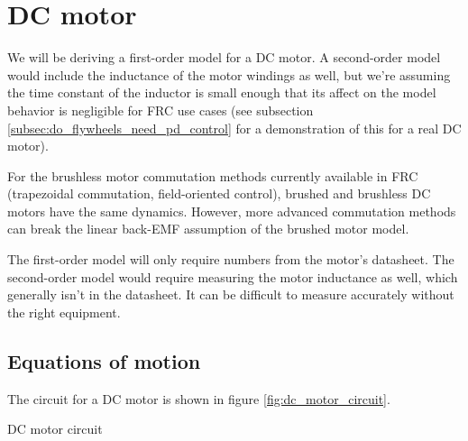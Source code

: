 \section{DC motor}
\label{sec:dc_motor}

We will be deriving a first-order \gls{model} for a DC motor. A second-order
\gls{model} would include the inductance of the motor windings as well, but
we're assuming the time constant of the inductor is small enough that its affect
on the \gls{model} behavior is negligible for FRC use cases (see subsection
\ref{subsec:do_flywheels_need_pd_control} for a demonstration of this for a real
DC motor).
\begin{remark}
  For the brushless motor commutation methods currently available in FRC
  (trapezoidal commutation, field-oriented control), brushed and brushless DC
  motors have the same dynamics. However, more advanced commutation methods can
  break the linear back-EMF assumption of the brushed motor model.
\end{remark}

The first-order \gls{model} will only require numbers from the motor's
datasheet. The second-order \gls{model} would require measuring the motor
inductance as well, which generally isn't in the datasheet. It can be difficult
to measure accurately without the right equipment.

\subsection{Equations of motion}

The circuit for a DC motor is shown in figure
\ref{fig:dc_motor_circuit}.
\begin{bookfigure}

  \caption{DC motor circuit}
  \label{fig:dc_motor_circuit}
\end{bookfigure}

